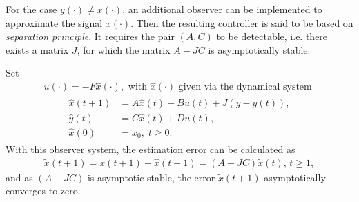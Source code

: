 For the case $y(\cdot) \neq x(\cdot)$, an additional observer can be implemented to approximate the signal $x(\cdot)$. Then the resulting  controller is said to be based on \textit{separation principle}.
It requires the pair $(A,C)$ to be detectable, i.e. there exists a matrix $J$, for which the matrix $A - JC$ is asymptotically stable.

Set 
\begin{align}
u(\cdot)= -F \hat{x}(\cdot), \text{ with } \hat{x}(\cdot) \text{ given via the dynamical system }
\end{align}
\begin{align}
\begin{split}
\hat{x}(t+1) &= A\hat{x}(t) + B u(t) + J (y - \hat{y}(t)), \\
\hat{y}(t) & = C\hat{x}(t) + D u(t), \\
\hat{x}(0)& = x_0, \; t \geq 0. 
\end{split}
\end{align}
With this observer system, the estimation error can be calculated as \begin{align}
\tilde{x}(t+1) = x(t+1) - \hat{x}(t+1) = (A - JC) \tilde{x}(t), \, t \geq 1,
\end{align} and as $(A - JC)$ is asymptotic stable,  the error $\tilde{x}(t+1)$ asymptotically converges to zero. 

